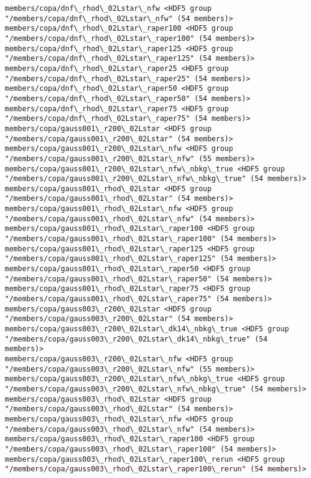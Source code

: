 \documentclass[11pt]{article}
\begin{document}
\begin{Verbatim}[commandchars=\\\{\}]
members/copa/dnf\_rhod\_02Lstar\_nfw <HDF5 group "/members/copa/dnf\_rhod\_02Lstar\_nfw" (54 members)>
members/copa/dnf\_rhod\_02Lstar\_raper100 <HDF5 group "/members/copa/dnf\_rhod\_02Lstar\_raper100" (54 members)>
members/copa/dnf\_rhod\_02Lstar\_raper125 <HDF5 group "/members/copa/dnf\_rhod\_02Lstar\_raper125" (54 members)>
members/copa/dnf\_rhod\_02Lstar\_raper25 <HDF5 group "/members/copa/dnf\_rhod\_02Lstar\_raper25" (54 members)>
members/copa/dnf\_rhod\_02Lstar\_raper50 <HDF5 group "/members/copa/dnf\_rhod\_02Lstar\_raper50" (54 members)>
members/copa/dnf\_rhod\_02Lstar\_raper75 <HDF5 group "/members/copa/dnf\_rhod\_02Lstar\_raper75" (54 members)>
members/copa/gauss001\_r200\_02Lstar <HDF5 group "/members/copa/gauss001\_r200\_02Lstar" (54 members)>
members/copa/gauss001\_r200\_02Lstar\_nfw <HDF5 group "/members/copa/gauss001\_r200\_02Lstar\_nfw" (55 members)>
members/copa/gauss001\_r200\_02Lstar\_nfw\_nbkg\_true <HDF5 group "/members/copa/gauss001\_r200\_02Lstar\_nfw\_nbkg\_true" (54 members)>
members/copa/gauss001\_rhod\_02Lstar <HDF5 group "/members/copa/gauss001\_rhod\_02Lstar" (54 members)>
members/copa/gauss001\_rhod\_02Lstar\_nfw <HDF5 group "/members/copa/gauss001\_rhod\_02Lstar\_nfw" (54 members)>
members/copa/gauss001\_rhod\_02Lstar\_raper100 <HDF5 group "/members/copa/gauss001\_rhod\_02Lstar\_raper100" (54 members)>
members/copa/gauss001\_rhod\_02Lstar\_raper125 <HDF5 group "/members/copa/gauss001\_rhod\_02Lstar\_raper125" (54 members)>
members/copa/gauss001\_rhod\_02Lstar\_raper50 <HDF5 group "/members/copa/gauss001\_rhod\_02Lstar\_raper50" (54 members)>
members/copa/gauss001\_rhod\_02Lstar\_raper75 <HDF5 group "/members/copa/gauss001\_rhod\_02Lstar\_raper75" (54 members)>
members/copa/gauss003\_r200\_02Lstar <HDF5 group "/members/copa/gauss003\_r200\_02Lstar" (54 members)>
members/copa/gauss003\_r200\_02Lstar\_dk14\_nbkg\_true <HDF5 group "/members/copa/gauss003\_r200\_02Lstar\_dk14\_nbkg\_true" (54 members)>
members/copa/gauss003\_r200\_02Lstar\_nfw <HDF5 group "/members/copa/gauss003\_r200\_02Lstar\_nfw" (55 members)>
members/copa/gauss003\_r200\_02Lstar\_nfw\_nbkg\_true <HDF5 group "/members/copa/gauss003\_r200\_02Lstar\_nfw\_nbkg\_true" (54 members)>
members/copa/gauss003\_rhod\_02Lstar <HDF5 group "/members/copa/gauss003\_rhod\_02Lstar" (54 members)>
members/copa/gauss003\_rhod\_02Lstar\_nfw <HDF5 group "/members/copa/gauss003\_rhod\_02Lstar\_nfw" (54 members)>
members/copa/gauss003\_rhod\_02Lstar\_raper100 <HDF5 group "/members/copa/gauss003\_rhod\_02Lstar\_raper100" (54 members)>
members/copa/gauss003\_rhod\_02Lstar\_raper100\_rerun <HDF5 group "/members/copa/gauss003\_rhod\_02Lstar\_raper100\_rerun" (54 members)>

\end{Verbatim}
\end{document}
